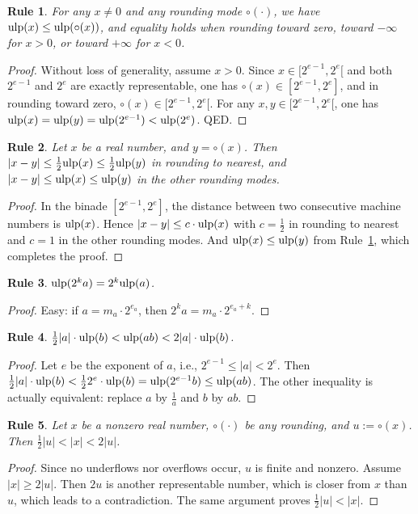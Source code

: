 \documentclass[12pt]{amsart}
\def\ulp{{\rm ulp}}
\newtheorem{Rule}{Rule}
\begin{document}
\begin{Rule} \label{R8}
For any $x \neq 0$ and any rounding mode $\circ(\cdot)$,
we have $\ulp(x) \leq \ulp(\circ(x))$, and equality holds when rounding toward
zero, toward $-\infty$ for $x>0$, or toward $+\infty$ for $x<0$.
\end{Rule}
\begin{proof}
Without loss of generality, assume $x > 0$. Since $x \in [2^{e-1},2^e[$
and both $2^{e-1}$ and $2^e$ are exactly representable, one has
$\circ(x) \in [2^{e-1},2^e]$, and in rounding toward zero,
$\circ(x) \in [2^{e-1},2^e[$. For any $x, y \in [2^{e-1},2^e[$, one has
$\ulp(x) = \ulp(y) = \ulp(2^{e-1}) < \ulp(2^e)$. QED.
\end{proof}

\begin{Rule} \label{R3}
Let $x$ be a real number, and $y = \circ(x)$.
Then $|x - y| \leq \frac{1}{2} \ulp(x) \leq \frac{1}{2} \ulp(y)$
in rounding to nearest,
and $|x - y| \leq \ulp(x) \leq \ulp(y)$ in the other rounding modes.
\end{Rule}
\begin{proof}
In the binade $[2^{e-1},2^e]$, the distance between two consecutive
machine numbers is $\ulp(x)$. Hence $|x - y| \leq c \cdot \ulp(x)$
with $c = \frac{1}{2}$ in rounding to nearest and $c = 1$ in the other
rounding modes. And $\ulp(x) \leq \ulp(y)$ from Rule~\ref{R8}, which
completes the proof.
\end{proof}

\begin{Rule} \label{R4}
$\ulp(2^k a) = 2^k \ulp(a)$.
\end{Rule}
\begin{proof}
Easy: if $a = m_a \cdot 2^{e_a}$, then $2^k a = m_a \cdot 2^{e_a+k}$.
\end{proof}

\begin{Rule} \label{R5}
$\frac{1}{2} |a| \cdot \ulp(b) < \ulp(a b) < 2 |a| \cdot \ulp(b)$.
\end{Rule}
\begin{proof}
Let $e$ be the exponent of $a$, i.e., $2^{e-1} \leq |a| < 2^e$. Then
$\frac{1}{2} |a| \cdot \ulp(b) < \frac{1}{2} 2^e \cdot \ulp(b) =
\ulp(2^{e-1} b) \leq \ulp(a b)$.
The other inequality is actually equivalent: replace $a$ by $\frac{1}{a}$
and $b$ by $ab$.
\end{proof}

\begin{Rule} \label{R6}
Let $x$ be a nonzero real number, $\circ(\cdot)$ be any rounding, and
$u := \circ(x)$. Then $\frac{1}{2} |u| < |x| < 2 |u|$.
\end{Rule}
\begin{proof}
Since no underflows nor overflows occur, $u$ is finite and nonzero.
Assume $|x| \geq 2 |u|$. Then $2u$ is another representable number,
which is closer from $x$ than $u$, which leads to a contradiction.
The same argument proves $\frac{1}{2} |u| < |x|$.
\end{proof}
\end{document}
